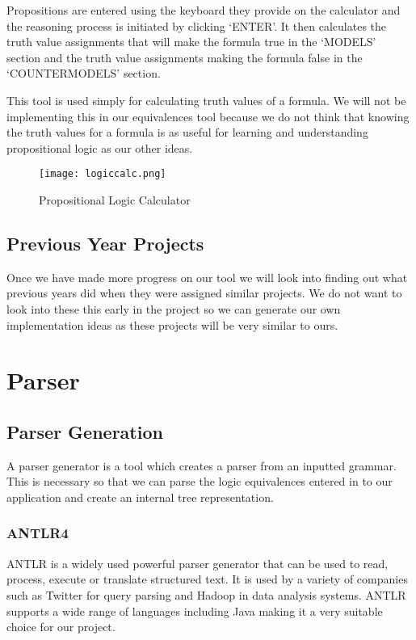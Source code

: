 \documentclass{report}
\begin{document}
Propositions are entered using the keyboard they provide on the calculator and the reasoning process is initiated by clicking `ENTER'. It then calculates the truth value assignments that will make the formula true in the `MODELS' section and the truth value assignments making the formula false in the `COUNTERMODELS' section.

This tool is used simply for calculating truth values of a formula. We will not be implementing this in our equivalences tool because we do not think that knowing the truth values for a formula is as useful for learning and understanding propositional logic as our other ideas.

\begin{figure}[ht]
    \centering
    \texttt{[image: logiccalc.png]}
    \caption{Propositional Logic Calculator}
    \label{logiccalc}
\end{figure}

\section{Previous Year Projects}

Once we have made more progress on our tool we will look into finding out what previous years did when they were assigned similar projects. We do not want to look into these this early in the project so we can generate our own implementation ideas as these projects will be very similar to ours.

\chapter{Parser}
\section{Parser Generation}

A parser generator is a tool which creates a parser from an inputted grammar. This is necessary so that we can parse the logic equivalences entered in to our application and create an internal tree representation.

\subsection{ANTLR4}

ANTLR is a widely used powerful parser generator that can be used to read, process, execute or translate structured text. It is used by a variety of companies such as Twitter for query parsing and Hadoop in data analysis systems. ANTLR supports a wide range of languages including Java making it a very suitable choice for our project.
\end{document}
